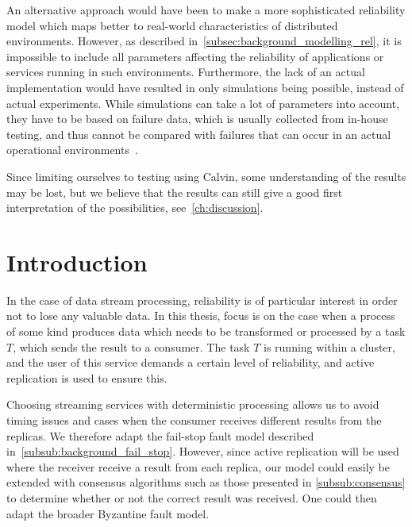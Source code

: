 \documentclass{cslthse-msc}
\begin{document}
An alternative approach would have been to make a more sophisticated reliability model which maps better to real-world characteristics of distributed environments. However, as described in~\cref{subsec:background_modelling_rel}, it is impossible to include all parameters affecting the reliability of applications or services running in such environments. Furthermore, the lack of an actual implementation would have resulted in only simulations being possible, instead of actual experiments. While simulations can take a lot of parameters into account, they have to be based on failure data, which is usually collected from in-house testing, and thus cannot be compared with failures that can occur in an actual operational environments~\cite{surveyReliabilityDistr}. %

Since limiting ourselves to testing using Calvin, some understanding of the results may be lost, but we believe that the results can still give a good first interpretation of the possibilities, see~\cref{ch:discussion}. 

\section{Introduction} \label{sec:design_intro}
In the case of data stream processing, reliability is of particular interest in order not to lose any valuable data. In this thesis, focus is on the case when a process of some kind produces data which needs to be transformed or processed by a task $T$, which sends the result to a consumer. The task $T$ is running within a cluster, and the user of this service demands a certain level of reliability, and active replication is used to ensure this.	

Choosing streaming services with deterministic processing allows us to avoid timing issues and cases when the consumer receives different results from the replicas. We therefore adapt the fail-stop fault model described in~\cref{subsub:background_fail_stop}. However, since active replication will be used where the receiver receive a result from each replica, our model could easily be extended with consensus algorithms such as those presented in \cref{subsub:consensus} to determine whether or not the correct result was received. One could then adapt the broader Byzantine fault model. 
\end{document}
